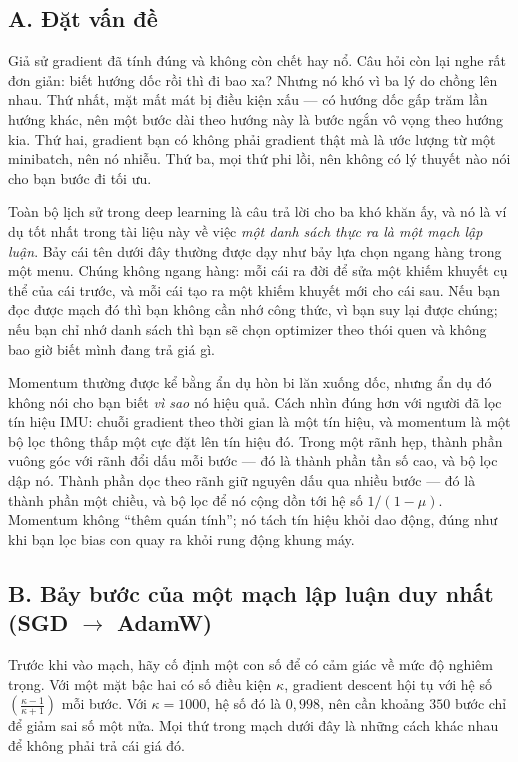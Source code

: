 \documentclass[../../../deep_learning.tex]{subfiles}
\begin{document}
\subsection{A. Đặt vấn đề}
Giả sử gradient đã tính đúng và không còn chết hay nổ. Câu hỏi còn lại nghe rất đơn giản: biết hướng dốc rồi thì đi bao xa? Nhưng nó khó vì ba lý do chồng lên nhau. Thứ nhất, mặt mất mát bị điều kiện xấu --- có hướng dốc gấp trăm lần hướng khác, nên một bước dài theo hướng này là bước ngắn vô vọng theo hướng kia. Thứ hai, gradient bạn có không phải gradient thật mà là ước lượng từ một minibatch, nên nó nhiễu. Thứ ba, mọi thứ phi lồi, nên không có lý thuyết nào nói cho bạn bước đi tối ưu.

Toàn bộ lịch sử  trong deep learning là câu trả lời cho ba khó khăn ấy, và nó là ví dụ tốt nhất trong tài liệu này về việc \emph{một danh sách thực ra là một mạch lập luận}. Bảy cái tên dưới đây thường được dạy như bảy lựa chọn ngang hàng trong một menu. Chúng không ngang hàng: mỗi cái ra đời để sửa một khiếm khuyết cụ thể của cái trước, và mỗi cái tạo ra một khiếm khuyết mới cho cái sau. Nếu bạn đọc được mạch đó thì bạn không cần nhớ công thức, vì bạn suy lại được chúng; nếu bạn chỉ nhớ danh sách thì bạn sẽ chọn optimizer theo thói quen và không bao giờ biết mình đang trả giá gì.

\begin{trucgiac}
Momentum thường được kể bằng ẩn dụ hòn bi lăn xuống dốc, nhưng ẩn dụ đó không nói cho bạn biết \emph{vì sao} nó hiệu quả. Cách nhìn đúng hơn với người đã lọc tín hiệu IMU: chuỗi gradient theo thời gian là một tín hiệu, và momentum là một bộ lọc thông thấp một cực đặt lên tín hiệu đó. Trong một rãnh hẹp, thành phần vuông góc với rãnh đổi dấu mỗi bước --- đó là thành phần tần số cao, và bộ lọc dập nó. Thành phần dọc theo rãnh giữ nguyên dấu qua nhiều bước --- đó là thành phần một chiều, và bộ lọc để nó cộng dồn tới hệ số \(1/(1-\mu)\). Momentum không ``thêm quán tính''; nó tách tín hiệu khỏi dao động, đúng như khi bạn lọc bias con quay ra khỏi rung động khung máy.
\end{trucgiac}

\subsection{B. Bảy bước của một mạch lập luận duy nhất (SGD \(\rightarrow\) AdamW)}
Trước khi vào mạch, hãy cố định một con số để có cảm giác về mức độ nghiêm trọng. Với một mặt bậc hai có số điều kiện \(\kappa\), gradient descent hội tụ với hệ số \(\left(\frac{\kappa-1}{\kappa+1}\right)\) mỗi bước. Với \(\kappa = 1000\), hệ số đó là \(0{,}998\), nên cần khoảng \(350\) bước chỉ để giảm sai số một nửa. Mọi thứ trong mạch dưới đây là những cách khác nhau để không phải trả cái giá đó.
\end{document}
